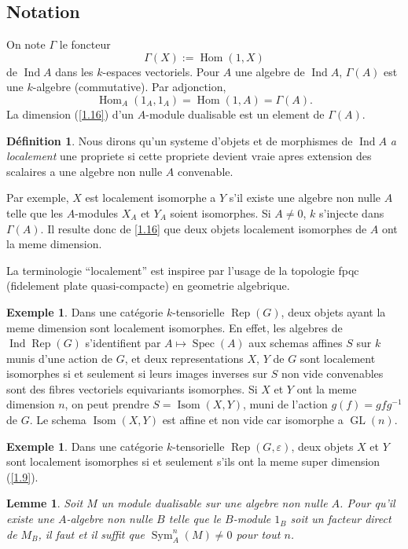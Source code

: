 \documentclass[11pt,a4paper]{article}
\theoremstyle{plain}
\newtheorem{lemma}[theorem]{Lemme}
\theoremstyle{definition}
\newtheorem{definition}[theorem]{D\'efinition}
\newtheorem{example}[theorem]{Exemple}
\DeclareMathOperator{\Hom}{Hom}
\DeclareMathOperator{\Spec}{Spec}
\DeclareMathOperator{\Sym}{Sym}
\DeclareMathOperator{\Ind}{Ind}
\DeclareMathOperator{\GL}{GL}
\newcommand{\Rep}{\operatorname{Rep}}
\newcommand{\Isom}{\operatorname{Isom}}
\begin{document}
\subsection{Notation}\label{2.4}

On note $\Gamma$ le foncteur
\[
\Gamma(X):=\Hom(1,X)
\]
de $\Ind A$ dans les $k$-espaces vectoriels. Pour $A$ une algebre de $\Ind A$, $\Gamma(A)$ est une $k$-algebre (commutative). Par adjonction,
\[
\Hom_A(1_A,1_A)=\Hom(1,A)=\Gamma(A).
\]
La dimension (\ref{1.16}) d'un $A$-module dualisable est un element de $\Gamma(A)$.

\begin{definition}\label{2.5}
Nous dirons qu'un systeme d'objets et de morphismes de $\Ind A$ \emph{a localement} une propriete si cette propriete devient vraie apres extension des scalaires a une algebre non nulle $A$ convenable.
\end{definition}

Par exemple, $X$ est localement isomorphe a $Y$ s'il existe une algebre non nulle $A$ telle que les $A$-modules $X_A$ et $Y_A$ soient isomorphes. Si $A\neq0$, $k$ s'injecte dans $\Gamma(A)$. Il resulte donc de \ref{1.16} que deux objets localement isomorphes de $A$ ont la meme dimension.

La terminologie ``localement'' est inspiree par l'usage de la topologie fpqc (fidelement plate quasi-compacte) en geometrie algebrique.

\begin{example}\label{2.6}
Dans une cat\'egorie $k$-tensorielle $\Rep(G)$, deux objets ayant la meme dimension sont localement isomorphes. En effet, les algebres de $\Ind\Rep(G)$ s'identifient par $A\mapsto\Spec(A)$ aux schemas affines $S$ sur $k$ munis d'une action de $G$, et deux representations $X$, $Y$ de $G$ sont localement isomorphes si et seulement si leurs images inverses sur $S$ non vide convenables sont des fibres vectoriels equivariants isomorphes. Si $X$ et $Y$ ont la meme dimension $n$, on peut prendre $S=\Isom(X,Y)$, muni de l'action $g(f)=gfg^{-1}$ de $G$. Le schema $\Isom(X,Y)$ est affine et non vide car isomorphe a $\GL(n)$.
\end{example}

\begin{example}\label{2.7}
Dans une cat\'egorie $k$-tensorielle $\Rep(G,\varepsilon)$, deux objets $X$ et $Y$ sont localement isomorphes si et seulement s'ils ont la meme super dimension (\ref{1.9}).
\end{example}

\begin{lemma}\label{2.8}
Soit $M$ un module dualisable sur une algebre non nulle $A$. Pour qu'il existe une $A$-algebre non nulle $B$ telle que le $B$-module $1_B$ soit un facteur direct de $M_B$, il faut et il suffit que $\Sym^n_A(M)\neq0$ pour tout $n$.
\end{lemma}
\end{document}
